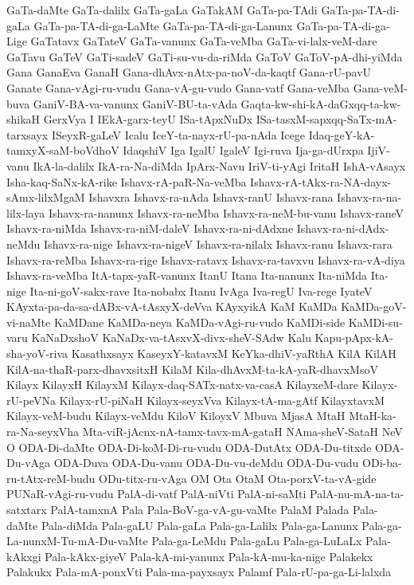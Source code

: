 {GaTa-daMte
GaTa-dalilx
GaTa-gaLa
GaTakAM
GaTa-pa-TAdi
GaTa-pa-TA-di-gaLa
GaTa-pa-TA-di-ga-LaMte
GaTa-pa-TA-di-ga-Lanunx
GaTa-pa-TA-di-ga-Lige
GaTatavx
GaTateV
GaTa-vanunx
GaTa-veMba
GaTa-vi-lalx-veM-dare
GaTavu
GaTeV
GaTi-sadeV
GaTi-su-vu-da-riMda
GaToV
GaToV-pA-dhi-yiMda
Gana
GanaEva
GanaH
Gana-dhAvx-nAtx-pa-noV-da-kaqtf
Gana-rU-pavU
Ganate
Gana-vAgi-ru-vudu
Gana-vA-gu-vudo
Gana-vatf
Gana-veMba
Gana-veM-buva
GaniV-BA-va-vanunx
GaniV-BU-ta-vAda
Gaqta-kw-shi-kA-daGxqq-ta-kw-shikaH
GerxVya
I
IEkA-garx-teyU
ISa-tApxNuDx
ISa-tasxM-sapxqq-SaTx-mA-tarxsayx
ISeyxR-gaLeV
Icalu
IceY-ta-nayx-rU-pa-nAda
Icege
Idaq-geY-kA-tamxyX-saM-boVdhoV
IdaqshiV
Iga
IgalU
IgaleV
Igi-ruva
Ija-ga-dUrxpa
IjiV-vanu
IkA-la-dalilx
IkA-ra-Na-diMda
IpArx-Navu
IriV-ti-yAgi
IritaH
IshA-vAsayx
Isha-kaq-SaNx-kA-rike
Ishavx-rA-paR-Na-veMba
Ishavx-rA-tAkx-ra-NA-dayx-sAmx-lilxMgaM
Ishavxra
Ishavx-ra-nAda
Ishavx-ranU
Ishavx-rana
Ishavx-ra-na-lilx-laya
Ishavx-ra-nanunx
Ishavx-ra-neMba
Ishavx-ra-neM-bu-vanu
Ishavx-raneV
Ishavx-ra-niMda
Ishavx-ra-niM-daleV
Ishavx-ra-ni-dAdxne
Ishavx-ra-ni-dAdx-neMdu
Ishavx-ra-nige
Ishavx-ra-nigeV
Ishavx-ra-nilalx
Ishavx-ranu
Ishavx-rara
Ishavx-ra-reMba
Ishavx-ra-rige
Ishavx-ratavx
Ishavx-ra-tavxvu
Ishavx-ra-vA-diya
Ishavx-ra-veMba
ItA-tapx-yaR-vanunx
ItanU
Itana
Ita-nanunx
Ita-niMda
Ita-nige
Ita-ni-goV-sakx-rave
Ita-nobabx
Itanu
IvAga
Iva-regU
Iva-rege
IyateV
KAyxta-pa-da-sa-dABx-vA-tAsxyX-deVva
KAyxyikA
KaM
KaMDa
KaMDa-goV-vi-naMte
KaMDane
KaMDa-neya
KaMDa-vAgi-ru-vudo
KaMDi-side
KaMDi-su-varu
KaNaDxshoV
KaNaDx-va-tAsxvX-divx-sheV-SAdw
Kalu
Kapu-pApx-kA-sha-yoV-riva
Kasathxsayx
KaseyxY-katavxM
KeYka-dhiV-yaRthA
KilA
KilAH
KilA-na-thaR-parx-dhavxsitxH
KilaM
Kila-dhAvxM-ta-kA-yaR-dhavxMsoV
Kilayx
KilayxH
KilayxM
Kilayx-daq-SATx-natx-va-casA
KilayxeM-dare
Kilayx-rU-peVNa
Kilayx-rU-piNaH
Kilayx-seyxVva
Kilayx-tA-ma-gAtf
KilayxtavxM
Kilayx-veM-budu
Kilayx-veMdu
KiloV
KiloyxV
Mbuva
MjasA
MtaH
MtaH-ka-ra-Na-seyxVha
Mta-viR-jAcnx-nA-tamx-tavx-mA-gataH
NAma-sheV-SataH
NeV
O
ODA-Di-daMte
ODA-Di-koM-Di-ru-vudu
ODA-DutAtx
ODA-Du-titxde
ODA-Du-vAga
ODA-Duva
ODA-Du-vanu
ODA-Du-vu-deMdu
ODA-Du-vudu
ODi-ba-ru-tAtx-reM-budu
ODu-titx-ru-vAga
OM
Ota
OtaM
Ota-porxV-ta-vA-gide
PUNaR-vAgi-ru-vudu
PalA-di-vatf
PalA-niVti
PalA-ni-saMti
PalA-nu-mA-na-ta-satxtarx
PalA-tamxnA
Pala
Pala-BoV-ga-vA-gu-vaMte
PalaM
Palada
Pala-daMte
Pala-diMda
Pala-gaLU
Pala-gaLa
Pala-ga-Lalilx
Pala-ga-Lanunx
Pala-ga-La-nunxM-Tu-mA-Du-vaMte
Pala-ga-LeMdu
Pala-gaLu
Pala-ga-LuLaLx
Pala-kAkxgi
Pala-kAkx-giyeV
Pala-kA-mi-yanunx
Pala-kA-mu-ka-nige
Palakekx
Palakukx
Pala-mA-ponxVti
Pala-ma-payxsayx
Palamf
Pala-rU-pa-ga-Li-lalxda
}
